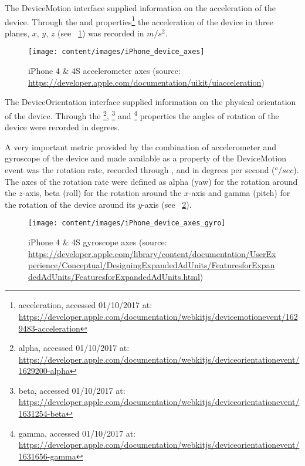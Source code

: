 The DeviceMotion interface supplied information on the acceleration of the device. Through the  and  properties\footnote{acceleration, accessed 01/10/2017 at: \url{https://developer.apple.com/documentation/webkitjs/devicemotionevent/1629483-acceleration}} the acceleration of the device in three planes, $x$, $y$, $z$ (see ~\ref{fig:iphoneAxes}) was recorded in $m/s^{2}$. 

\begin{figure}[h]
	\centering
	\texttt{[image: content/images/iPhone\_device\_axes]}
	\caption{iPhone 4 \& 4S accelerometer axes (source: \url{https://developer.apple.com/documentation/uikit/uiacceleration})}
	\label{fig:iphoneAxes}
\end{figure}

The DeviceOrientation interface supplied information on the physical orientation of the device. Through the \footnote{alpha, accessed 01/10/2017 at: \url{https://developer.apple.com/documentation/webkitjs/deviceorientationevent/1629200-alpha}}, \footnote{beta, accessed 01/10/2017 at: \url{https://developer.apple.com/documentation/webkitjs/deviceorientationevent/1631254-beta}} and \footnote{gamma, accessed 01/10/2017 at: \url{https://developer.apple.com/documentation/webkitjs/deviceorientationevent/1631656-gamma}} properties the angles of rotation of the device were recorded in degrees. 

A very important metric provided by the combination of accelerometer and gyroscope of the device and made available as a property of the DeviceMotion event was the rotation rate, recorded through ,  and  in degrees per second ($^{o}/sec$). The axes of the rotation rate were defined as alpha (yaw) for the rotation around the $z$-axis, beta (roll) for the rotation around the $x$-axis and gamma (pitch) for the rotation of the device around its $y$-axis (see ~\ref{fig:iphoneAxesGyro}). 

\begin{figure}[h]
	\centering
	\texttt{[image: content/images/iPhone\_device\_axes\_gyro]}
	\caption{iPhone 4 \& 4S gyroscope axes (source: \url{https://developer.apple.com/library/content/documentation/UserExperience/Conceptual/DesigningExpandedAdUnits/FeaturesforExpandedAdUnits/FeaturesforExpandedAdUnits.html})}
	\label{fig:iphoneAxesGyro}
\end{figure}

